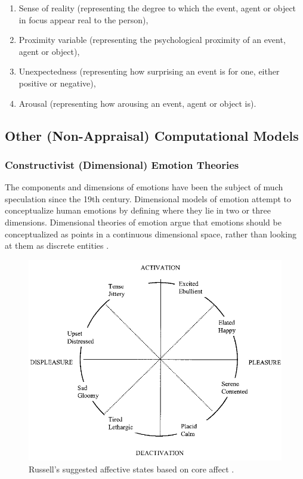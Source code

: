 \documentclass[12pt]{report}
\begin{document}
\begin{enumerate}
	\item Sense of reality (representing the degree to which the event, agent or
	object in focus appear real to the person),

	\item Proximity variable (representing the psychological proximity of an event,
	agent or object),

	\item Unexpectedness (representing how surprising an event is for one, either
	positive or negative),

	\item Arousal (representing how arousing an event, agent or object is).
\end{enumerate}

\subsection{Other (Non-Appraisal) Computational Models}

\subsubsection{Constructivist (Dimensional) Emotion Theories}
\label{sec:dimensional-emotions}

The components and dimensions of emotions have been the subject of much
speculation since the 19th century. Dimensional models of emotion attempt to
conceptualize human emotions by defining where they lie in two or three
dimensions. Dimensional theories of emotion argue that emotions should be
conceptualized as points in a continuous dimensional space, rather than looking
at them as discrete entities \cite{carver:affect-behavior}
\cite{mehrabian-russell:pad} \cite{russell:core-affect}
\cite{watson:consensual-structure-mood}.

\begin{figure}[tbh]
  \center
  \includegraphics[width=.7\textwidth]{figure/core-affect.png}
  \caption{Russell's suggested affective states based on core affect
  \cite{russell:core-affect}.}
  \label{fig:core-affect}
\end{figure}
\end{document}
